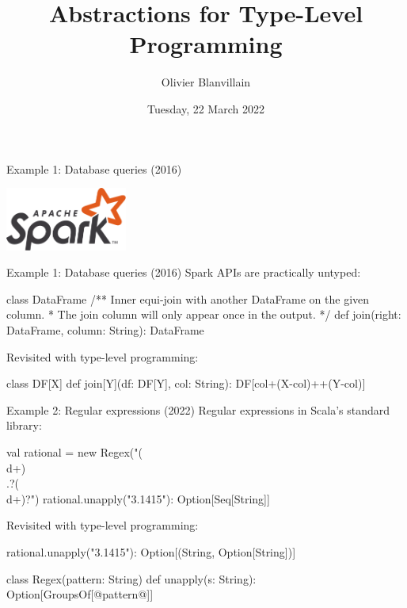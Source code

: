 \documentclass[10pt]{beamer}
\title{Abstractions for Type-Level Programming}
\date{Tuesday, 22 March 2022}
\author{Olivier Blanvillain}
\newenvironment{slide}[2][]
  {\begin{frame}[fragile,environment=slide,#1]{#2}}
  {\end{frame}}
\begin{document}
\maketitle

\begin{slide}{Example 1: Database queries (2016)}
\begin{center}
\includegraphics[width=0.3\textwidth]{figures/spark.pdf}
\end{center}
\end{slide}

\begin{slide}{Example 1: Database queries (2016)}
Spark APIs are practically untyped:
\begin{code}
class DataFrame {
  /** Inner equi-join with another DataFrame on the given column.
   *  The join column will only appear once in the output. */
  def join(right: DataFrame, column: String): DataFrame
}
\end{code}
\pause
Revisited with type-level programming:
\begin{code}
class DF[X] {
  def join[Y](df: DF[Y], col: String): DF[col+(X-col)++(Y-col)]
}
\end{code}
\end{slide}

\begin{slide}{Example 2: Regular expressions (2022)}
Regular expressions in Scala's standard library:
\begin{code}
val rational = new Regex("(\\d+)\\.?(\\d+)?")
rational.unapply("3.1415"): Option[Seq[String]]
\end{code}
\pause
Revisited with type-level programming:
\begin{code}
rational.unapply("3.1415"): Option[(String, Option[String])]
\end{code}
\pause
\begin{code}
class Regex(pattern: String) {
  def unapply(s: String): Option[GroupsOf[@pattern@]]
}
\end{code}
\end{slide}
\end{document}
